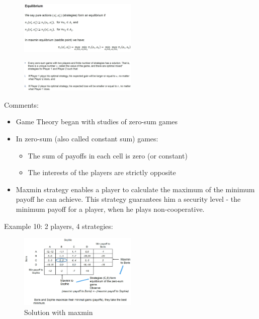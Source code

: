 \begin{figure}[H]
    \centering
    \includegraphics[width=0.5\textwidth]{Pictures/equilibrium.png}
\end{figure}

\begin{theorem}    
\end{theorem}

\begin{figure}[H]
    \centering
    \includegraphics[width=0.5\textwidth]{Pictures/maxmin_theorem.png}
\end{figure}

Comments:
\begin{itemize}
    \item Game Theory began with studies of zero-sum games
    \item In zero-sum (also called constant sum) games:
        \begin{itemize}
            \item The sum of payoffs in each cell is zero (or constant)
            \item The interests of the players are strictly opposite
        \end{itemize}
    \item Maxmin strategy enables a player to calculate the maximum of the minimum
        payoff he can achieve. This strategy guarantees him a security level -
        the minimum payoff for a player, when he plays non-cooperative.
\end{itemize}

Example 10: 2 players, 4 strategies:

\begin{figure}[H]
    \centering
    \includegraphics[width=0.5\textwidth]{Pictures/example_10.png}
    \caption{Solution with maxmin}
\end{figure}


